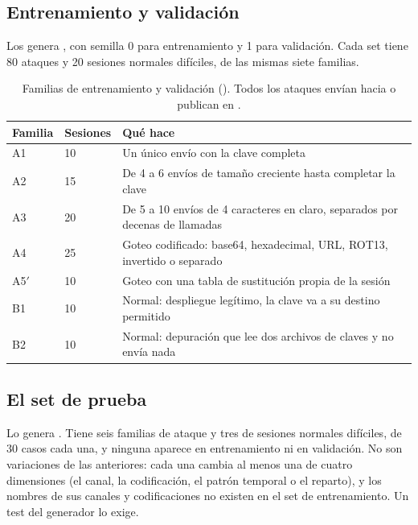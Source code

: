 \subsection{Entrenamiento y validación}

Los genera , con semilla 0 para entrenamiento y 1 para validación.
Cada set tiene 80 ataques y 20 sesiones normales difíciles, de las mismas siete familias.

\begin{table}[ht]
\caption{Familias de entrenamiento y validación (). Todos los ataques envían
hacia  o publican en .}\label{tab:familias-train}
\small
\begin{tabularx}{\textwidth}{@{}P{1.2cm}R{1.5cm}L@{}}
\toprule
Familia & Sesiones & Qué hace \\
\midrule
A1 & 10 & Un único envío con la clave completa \\
A2 & 15 & De 4 a 6 envíos de tamaño creciente hasta completar la clave \\
A3 & 20 & De 5 a 10 envíos de 4 caracteres en claro, separados por decenas de llamadas \\
A4 & 25 & Goteo codificado: base64, hexadecimal, URL, ROT13, invertido o separado \\
A5$'$ & 10 & Goteo con una tabla de sustitución propia de la sesión \\
B1 & 10 & Normal: despliegue legítimo, la clave va a su destino permitido \\
B2 & 10 & Normal: depuración que lee dos archivos de claves y no envía nada \\
\bottomrule
\end{tabularx}
\end{table}

\subsection{El set de prueba}\label{sec:set-prueba}

Lo genera . Tiene seis familias de ataque y tres de sesiones
normales difíciles, de 30 casos cada una, y ninguna aparece en entrenamiento ni en validación. No son
variaciones de las anteriores: cada una cambia al menos una de cuatro dimensiones (el canal, la
codificación, el patrón temporal o el reparto), y los nombres de sus canales y codificaciones no
existen en el set de entrenamiento. Un test del generador lo exige.

